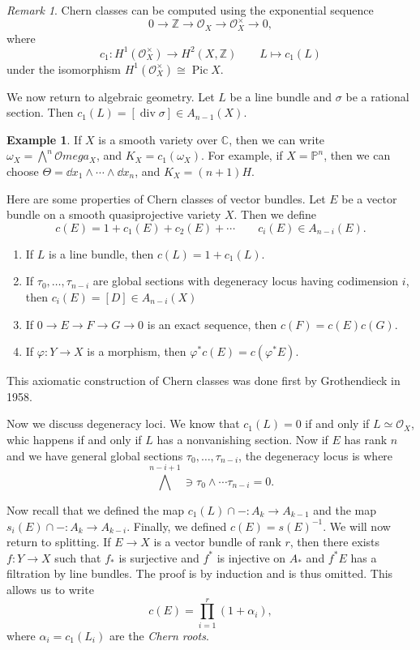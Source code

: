 \documentclass[leqno, openany]{memoir}
\theoremstyle{definition}
\newtheorem{exm}[thm]{Example}
\theoremstyle{remark}
\newtheorem{rmk}[thm]{Remark}
\theoremstyle{plain}
\theoremstyle{definition}
\theoremstyle{remark}
\newcommand{\C}{\mathbb{C}}
\newcommand{\Z}{\mathbb{Z}}
\renewcommand{\P}{\mathbb{P}}
\newcommand{\mc}[1]{\mathcal{#1}}
\renewcommand{\div}{\operatorname{div}}
\DeclareMathOperator{\Pic}{Pic}
\begin{document}
\begin{rmk}
    Chern classes can be computed using the exponential sequence 
    \[ 0 \to \Z \to \mc{O}_X \to \mc{O}_X^{\times} \to 0, \] 
    where
    \[ c_1 \colon H^1(\mc{O}_X^{\times}) \to H^2(X, \Z) \qquad L \mapsto c_1(L) \]
    under the isomorphism $H^1(\mc{O}_X^{\times}) \cong \Pic X$.
\end{rmk}

We now return to algebraic geometry. Let $L$ be a line bundle and $\sigma$ be a rational section. Then $c_1(L) = [\div \sigma] \in A_{n-1}(X)$.

\begin{exm}
    If $X$ is a smooth variety over $\C$, then we can write $\omega_X = \bigwedge^n \mc{O}mega_X$, and $K_X = c_1(\omega_X)$. For example, if $X = \P^n$, then we can choose $\Theta = \dd{x_1} \wedge \cdots \wedge \dd{x_n}$, and $K_X = (n+1)H$.
\end{exm}

Here are some properties of Chern classes of vector bundles. Let $E$ be a vector bundle on a smooth quasiprojective variety $X$. Then we define
\[ c(E) = 1 + c_1(E) + c_2(E) + \cdots \qquad c_i(E) \in A_{n-i}(E). \]
\begin{enumerate}
    \item If $L$ is a line bundle, then $c(L) = 1 + c_1(L)$.
    \item If $\tau_0, \ldots, \tau_{n-i}$ are global sections with degeneracy locus having codimension $i$, then $c_i(E) = [D] \in A_{n-i}(X)$
    \item If $0 \to E \to F \to G \to 0$ is an exact sequence, then $c(F) = c(E) c(G)$.
    \item If $\varphi \colon Y \to X$ is a morphism, then $\varphi^* c(E) = c(\varphi^* E)$.
\end{enumerate}
This axiomatic construction of Chern classes was done first by Grothendieck in 1958.

Now we discuss degeneracy loci. We know that $c_1(L) = 0$ if and only if $L \simeq \mc{O}_X$, whic happens if and only if $L$ has a nonvanishing section. Now if $E$ has rank $n$ and we have general global sections $\tau_0, \ldots, \tau_{n-i}$, the degeneracy locus is where
\[ {\bigwedge}^{n-i+1} \ni \tau_0 \wedge \cdots \tau_{n-i} = 0. \]

Now recall that we defined the map $c_1(L) \cap - \colon A_k \to A_{k-1}$ and the map $s_i(E) \cap - \colon A_k \to A_{k-i}$. Finally, we defined $c(E) = {s(E)}^{-1}$. We will now return to splitting. If $E \to X$ is a vector bundle of rank $r$, then there exists $f \colon Y \to X$ such that $f_*$ is surjective and $f^*$ is injective on $A_*$ and $f^* E$ has a filtration by line bundles. The proof is by induction and is thus omitted. This allows us to write 
\[ c(E) = \prod_{i=1}^r (1 + \alpha_i), \]
where $\alpha_i = c_1(L_i)$ are the \textit{Chern roots}.
\end{document}
